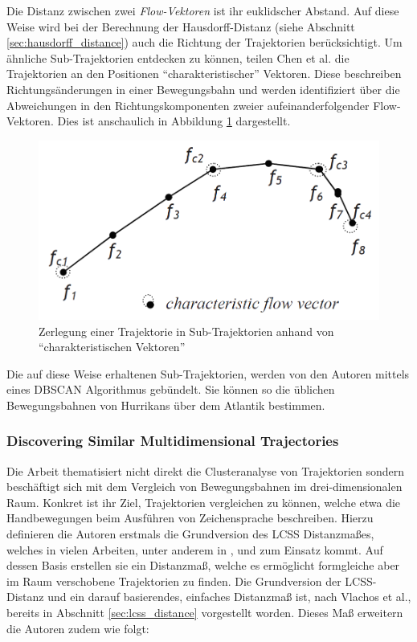 Die Distanz zwischen zwei \textit{Flow-Vektoren} ist ihr euklidscher Abstand. Auf diese Weise wird bei
der Berechnung der Hausdorff-Distanz (siehe Abschnitt \ref{sec:hausdorff_distance}) auch die Richtung
der Trajektorien berücksichtigt.
Um ähnliche Sub-Trajektorien entdecken zu können, teilen Chen et al. die Trajektorien an den Positionen
``charakteristischer'' Vektoren. Diese beschreiben Richtungsänderungen in einer
Bewegungsbahn und werden identifiziert über die Abweichungen in den Richtungskomponenten zweier
aufeinanderfolgender Flow-Vektoren. Dies ist anschaulich in Abbildung \ref{fig:relw_chen_flow_vector} dargestellt.

\begin{figure}[H]
    \centering
    \includegraphics[width=0.45\linewidth]{resources/img/RelatedWork/Chen_trajectory_splitting}
    \caption[Zerlegung einer Trajektorie in Sub-Trajektorien (Chen et al.)]{Zerlegung einer Trajektorie in Sub-Trajektorien anhand von ``charakteristischen Vektoren'' \cite[]{Chen2011}}
    \label{fig:relw_chen_flow_vector}
\end{figure}

Die auf diese Weise erhaltenen Sub-Trajektorien, werden von den Autoren mittels eines DBSCAN Algorithmus gebündelt.
Sie können so die üblichen Bewegungsbahnen von Hurrikans über dem Atlantik bestimmen.


\subsubsection*{Discovering Similar Multidimensional Trajectories}
\label{sec:relw_vlachos}
Die Arbeit \cite[]{Vlachos2002} thematisiert nicht direkt die Clusteranalyse von Trajektorien sondern
beschäftigt sich mit dem Vergleich von Bewegungsbahnen im drei-dimensionalen Raum. Konkret ist ihr Ziel,
Trajektorien vergleichen zu können, welche etwa die Handbewegungen beim Ausführen von Zeichensprache beschreiben.
Hierzu definieren die Autoren erstmals die Grundversion des LCSS Distanzmaßes, welches in vielen Arbeiten,
unter anderem in \cite[]{Atev2006}, \cite[]{Buzan2004} und \cite[]{Chen2005} zum Einsatz kommt.
Auf dessen Basis erstellen sie ein Distanzmaß, welche es ermöglicht formgleiche aber im Raum verschobene Trajektorien zu finden.
Die Grundversion der LCSS-Distanz und ein darauf basierendes, einfaches Distanzmaß ist, nach Vlachos et al.,
bereits in Abschnitt \ref{sec:lcss_distance} vorgestellt worden.
Dieses Maß erweitern die Autoren zudem wie folgt:

